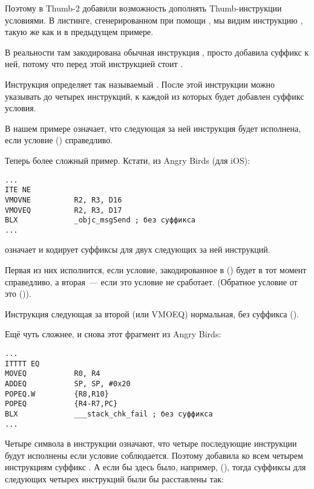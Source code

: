 Поэтому в Thumb-2 добавили возможность дополнять Thumb-инструкции условиями.
В листинге, сгенерированном при помощи \IDA, мы видим инструкцию , 
такую же как и в предыдущем примере.

В реальности там закодирована обычная инструкция , просто \IDA добавила суффикс  к ней, 
потому что перед этой инструкцией стоит .

\label{ARM_Thumb_IT}
Инструкция  определяет так называемый . 
После этой инструкции можно указывать до четырех инструкций, 
к каждой из которых будет добавлен суффикс условия.

В нашем примере  означает,
что следующая за ней инструкция будет исполнена, если условие
 () справедливо.

Теперь более сложный пример. Кстати, из 
Angry Birds (для iOS):

\begin{lstlisting}[caption=Angry Birds Classic]
...
ITE NE
VMOVNE          R2, R3, D16
VMOVEQ          R2, R3, D17
BLX             _objc_msgSend ; без суффикса
...
\end{lstlisting}

 означает  
и кодирует суффиксы для двух следующих за ней инструкций.

Первая из них исполнится, если условие, закодированное в  () будет в тот момент справедливо,
а вторая~--- если это условие не сработает.
(Обратное условие от  это  ()).

Инструкция следующая за второй  (или VMOEQ) нормальная, без суффикса ().

Ещё чуть сложнее, и снова этот фрагмент из Angry Birds:

\begin{lstlisting}[caption=Angry Birds Classic]
...
ITTTT EQ
MOVEQ           R0, R4
ADDEQ           SP, SP, #0x20
POPEQ.W         {R8,R10}
POPEQ           {R4-R7,PC}
BLX             ___stack_chk_fail ; без суффикса
...
\end{lstlisting}

Четыре символа  в инструкции означают, что четыре последующие инструкции будут исполнены если условие соблюдается.
Поэтому \IDA добавила ко всем четырем инструкциям суффикс . 
А если бы здесь было, например,
 (), 
тогда суффиксы для следующих четырех инструкций были бы расставлены так:

